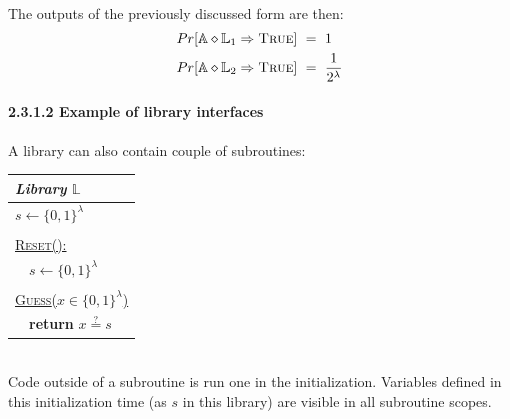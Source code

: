 \documentclass{article}
\begin{document}
\begin{adjustwidth}{2em}{}
\begin{adjustwidth}{2em}{}
\begin{adjustwidth}{2em}{4em}
\begin{adjustwidth}{2em}{}
\begin{center}
\begin{tabular}{|l|}
								\hline							
							\end{tabular}
						\end{center}
						\hfill \\
						The outputs of the previously discussed form are then:
						\begin{align*}
							Pr[\mathbb{A} \diamond \mathbb{L}_1 \Rightarrow \textsc{True}] \ & = \ 1 \\
							Pr[\mathbb{A} \diamond \mathbb{L}_2 \Rightarrow \textsc{True}] \ & = \ \frac{1}{2^{\lambda}}
						\end{align*}						
					\end{adjustwidth}
					\paragraph{2.3.1.2 Example of library interfaces}
					\begin{adjustwidth}{2em}{}
						A library can also contain couple of subroutines: \\
						\begin{center}
							\begin{tabular}{|l|}
								\hline
								\cellcolor{gray!80} \textbf{\textit{Library}} $\mathbb{L}$ \\
								\hline
								$s \leftarrow \{ 0,1 \}^{\lambda}$ \\
								\\
								\underline{\textsc{Reset}():} \\
								\ \ $s \leftarrow \{ 0,1 \}^{\lambda}$ \\
								\\
								\underline{\textsc{Guess}($x \in \{ 0,1 \}^{\lambda}$)} \\
								\ \ \textbf{return} $x \stackrel{?}{=} s$ \\
								\hline							
							\end{tabular}
						\end{center}
						\hfill \\
						Code outside of a subroutine is run one in the initialization. Variables defined in this initialization time (as $s$ in this library) are visible in all subroutine scopes.
					\end{adjustwidth}
				\end{adjustwidth}

\end{adjustwidth}
\end{adjustwidth}
\end{document}

